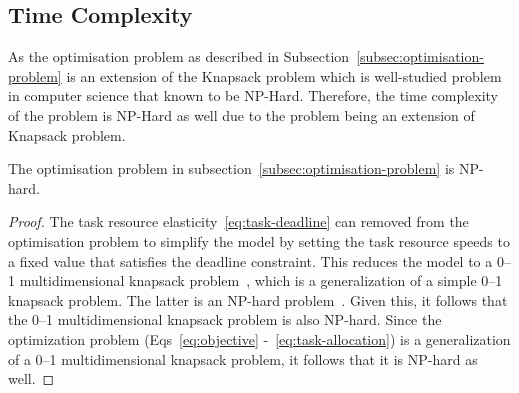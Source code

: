 \subsection{Time Complexity}
\label{subsec:time-complexity}
As the optimisation problem as described in Subsection~\ref{subsec:optimisation-problem} is an extension of the
Knapsack problem which is well-studied problem in computer science that known to be NP-Hard.
Therefore, the time complexity of the problem is NP-Hard as well due to the problem being an extension of
Knapsack problem.
\begin{theorem}
    The optimisation problem in subsection~\ref{subsec:optimisation-problem} is NP-hard.
\end{theorem}
\begin{proof}
    The task resource elasticity~\ref{eq:task-deadline} can removed from the optimisation problem to simplify the model
    by setting the task resource speeds to a fixed value that satisfies the deadline constraint. This reduces the model
    to a 0--1 multidimensional knapsack problem~\cite{knapsackproblems_2004}, which is a generalization of a
    simple 0--1 knapsack problem. The latter is an NP-hard problem~\cite{knapsackproblems_2004}. Given this, it follows
    that the 0--1 multidimensional knapsack problem is also NP-hard. Since the optimization problem
    (Eqs~\ref{eq:objective} -~\ref{eq:task-allocation}) is a generalization of a 0--1 multidimensional knapsack
    problem, it follows that it is NP-hard as well.
\end{proof}

